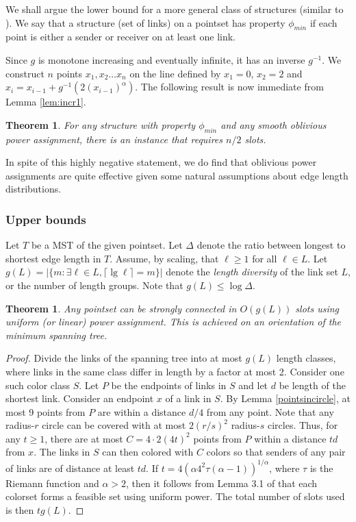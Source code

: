 \documentclass[11pt]{amsart}
\newcounter{foo}
\newtheorem{theorem}[foo]{Theorem}
\begin{document}
We shall argue the lower bound for a more general class of structures
(similar to \cite{MoWa06}).
We say that a structure (set of links) on a pointset has property
$\phi_{min}$ if each point is either a sender or receiver on at least
one link.

Since $g$ is monotone increasing and eventually infinite, it has an
inverse $g^{-1}$.
We construct $n$ points $x_1, x_2 \ldots x_n$ on the line defined by
$x_1 = 0$, $x_2 = 2$ and $x_i = x_{i-1} + g^{-1}(2(x_{i-1})^\alpha)$.
The following result is now immediate from Lemma \ref{lem:incr1}.

\begin{theorem}
For any structure with property $\phi_{min}$
and any smooth oblivious power assignment,
there is an instance that requires $n/2$ slots.
\end{theorem}

In spite of this highly negative statement, we do find that oblivious
power assignments are quite effective given some natural assumptions
about edge length distributions. 


\subsubsection*{Upper bounds}

Let $T$ be a MST of the given pointset.  Let $\Delta$ denote the ratio
between longest to shortest edge length in $T$.  Assume, by scaling,
that $\ell \geq 1$ for all $\ell \in L$. Let $g(L) = |\{m: 
\exists \ell \in L, \lceil \lg \ell \rceil = m \}|$ denote the
\emph{length diversity} of the link set $L$, or the number of length
groups. Note that $g(L) \le \log \Delta$.

\begin{theorem}
Any pointset can be strongly connected in $O(g(L))$
slots using uniform (or linear) power assignment.
This is achieved on an orientation of the minimum spanning tree.
\label{logdelta}
\end{theorem}

\begin{proof}
Divide the links of the spanning tree into at most $g(L)$ length
classes, where links in the same class differ in length by a factor at
most 2. Consider one such color class $S$.
Let $P$ be the endpoints of links in $S$ and let $d$ be length of
the shortest link.
Consider an endpoint $x$ of a link in $S$.
By Lemma \ref{pointsincircle}, at most 9 points from $P$ are within a
distance $d/4$ from any point. Note that any radius-$r$ circle can be
covered with at most $2(r/s)^2$ radius-$s$ circles.
Thus, for any $t \ge 1$, there are at most $C = 4 \cdot 2(4t)^2$ points
from $P$ within a distance $td$ from $x$.
The links in $S$ can then colored with $C$ colors so that senders of any pair of
links are of distance at least $td$. 
If $t = 4(\alpha 4^2 \tau(\alpha-1))^{1/\alpha}$, where $\tau$ is the
Riemann function and $\alpha > 2$, then it follows from Lemma 3.1 of
\cite{us:esa09full} that each colorset forms a feasible set using
uniform power.
The total number of slots used is then $t g(L)$.
\end{proof}
\end{document}

